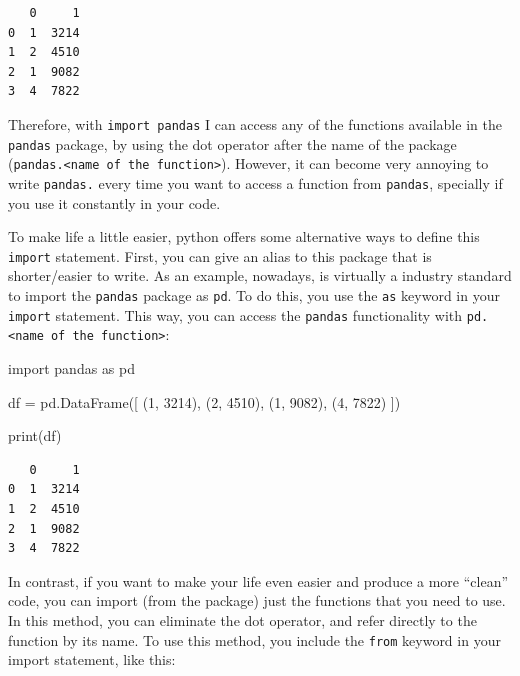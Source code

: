\documentclass[
  11pt,
  letterpaper,
  DIV=11,
  numbers=noendperiod]{scrreprt}
\newenvironment{Shaded}{\begin{snugshade}}{\end{snugshade}}
\newcommand{\BuiltInTok}[1]{\textcolor[rgb]{0.00,0.23,0.31}{#1}}
\newcommand{\DecValTok}[1]{\textcolor[rgb]{0.68,0.00,0.00}{#1}}
\newcommand{\ImportTok}[1]{\textcolor[rgb]{0.00,0.46,0.62}{#1}}
\newcommand{\NormalTok}[1]{\textcolor[rgb]{0.00,0.23,0.31}{#1}}
\newcommand{\OperatorTok}[1]{\textcolor[rgb]{0.37,0.37,0.37}{#1}}
\begin{document}
\begin{verbatim}
   0     1
0  1  3214
1  2  4510
2  1  9082
3  4  7822
\end{verbatim}

Therefore, with \texttt{import\ pandas} I can access any of the
functions available in the \texttt{pandas} package, by using the dot
operator after the name of the package
(\texttt{pandas.\textless{}name\ of\ the\ function\textgreater{}}).
However, it can become very annoying to write \texttt{pandas.} every
time you want to access a function from \texttt{pandas}, specially if
you use it constantly in your code.

To make life a little easier, python offers some alternative ways to
define this \texttt{import} statement. First, you can give an alias to
this package that is shorter/easier to write. As an example, nowadays,
is virtually a industry standard to import the \texttt{pandas} package
as \texttt{pd}. To do this, you use the \texttt{as} keyword in your
\texttt{import} statement. This way, you can access the \texttt{pandas}
functionality with
\texttt{pd.\textless{}name\ of\ the\ function\textgreater{}}:

\begin{Shaded}
\begin{Highlighting}[]
\ImportTok{import}\NormalTok{ pandas }\ImportTok{as}\NormalTok{ pd}

\NormalTok{df }\OperatorTok{=}\NormalTok{ pd.DataFrame([}
\NormalTok{  (}\DecValTok{1}\NormalTok{, }\DecValTok{3214}\NormalTok{), (}\DecValTok{2}\NormalTok{, }\DecValTok{4510}\NormalTok{), }
\NormalTok{  (}\DecValTok{1}\NormalTok{, }\DecValTok{9082}\NormalTok{), (}\DecValTok{4}\NormalTok{, }\DecValTok{7822}\NormalTok{)}
\NormalTok{])}

\BuiltInTok{print}\NormalTok{(df)}
\end{Highlighting}
\end{Shaded}

\begin{verbatim}
   0     1
0  1  3214
1  2  4510
2  1  9082
3  4  7822
\end{verbatim}

In contrast, if you want to make your life even easier and produce a
more ``clean'' code, you can import (from the package) just the
functions that you need to use. In this method, you can eliminate the
dot operator, and refer directly to the function by its name. To use
this method, you include the \texttt{from} keyword in your import
statement, like this:
\end{document}
